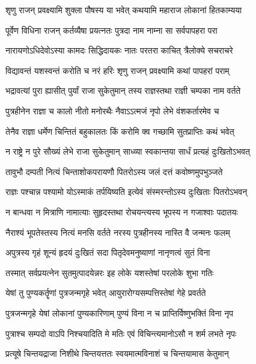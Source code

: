 
\twolineshloka
{शृणु राजन् प्रवक्ष्यामि शुक्ला पौषस्य या भवेत्}
{कथयामि महाराज लोकानां हितकाम्यया}%

\twolineshloka
{पूर्वेण विधिना राजन् कर्तव्यैषा प्रयत्नतः}
{पुत्रदा नाम नाम्ना सा सर्वपापहरा परा}%

\twolineshloka
{नारायणोऽधिदेवोऽस्या कामदः सिद्धिदायकः}
{नातः परतरा काचित् त्रैलोक्ये सचराचरे}%

\twolineshloka
{विद्यावन्तं यशस्वन्तं करोति च नरं हरिः}
{शृणु राजन् प्रवक्ष्यामि कथां पापहरां पराम्}%

\twolineshloka
{भद्रावत्यां पुरा ह्यासीत् पुर्यां राजा सुकेतुमान्}
{तस्य राज्ञस्तथा राज्ञी चम्पका नाम वर्तते}%

\twolineshloka
{पुत्रहीनेन राज्ञा च कालो नीतो मनोरथैः}
{नैवाऽऽत्मजं नृपो लेभे वंशकर्तारमेव च}%

\twolineshloka
{तेनैव राज्ञा धर्मेण चिन्तितं बहुकालतः}
{किं करोमि क्व गच्छामि सुतप्राप्तिः कथं भवेत्}%

\twolineshloka
{न राष्ट्रे न पुरे सौख्यं लेभे राजा सुकेतुमान्}
{साध्व्या स्वकान्तया सार्धं प्रत्यहं दुःखितोऽभवत्}%

\twolineshloka
{तावुभौ दम्पती नित्यं चिन्ताशोकपरायणौ}
{पितरोऽस्य जलं दत्तं कवोष्णमुपभुञ्जते}%

\twolineshloka
{राज्ञः पश्चान्न पश्यामो योऽस्माकं तर्पयिष्यति}
{इत्येवं संस्मरन्तोऽस्य दुःखिताः पितरोऽभवन्}%

\twolineshloka
{न बान्धवा न मित्राणि नामात्याः सुहृदस्तथा}
{रोचयन्त्यस्य भूपस्य न गजाश्वाः पदातयः}%

\twolineshloka
{नैराश्यं भूपतेस्तस्य नित्यं मनसि वर्तते}
{नरस्य पुत्रहीनस्य नास्ति वै जन्मनः फलम्}%

\twolineshloka
{अपुत्रस्य गृहं शून्यं हृदयं दुःखितं सदा}
{पितृदेवमनुष्याणां नानृणत्वं सुतं विना}%

\twolineshloka
{तस्मात् सर्वप्रयत्नेन सुतमुत्पादयेन्नरः}
{इह लोके यशस्तेषां परलोके शुभा गतिः}%

\twolineshloka
{येषां तु पुण्यकर्तॄणां पुत्रजन्मगृहे भवेत्}
{आयुरारोग्यसम्पत्तिस्तेषां गेहे प्रवर्तते}%

\twolineshloka
{पुत्रजन्मगृहे येषां लोकानां पुण्यकारिणाम्}
{पुण्यं विना न च प्राप्तिर्विष्णुभक्तिं विना नृप}%

\twolineshloka
{पुत्राश्च सम्पदो वाऽपि निश्चयादिति मे मतिः}
{एवं विचिन्त्यमानोऽसौ न शर्म लभते नृपः}%

\twolineshloka
{प्रत्यूषे चिन्तयद्राजा निशीथे चिन्तयत्ततः}
{स्वयमात्मविनाशं च चिन्तयामास केतुमान्}%

